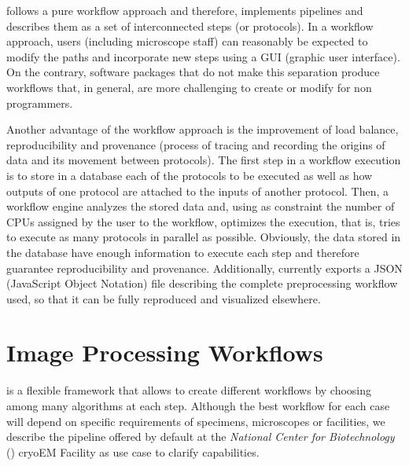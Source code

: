 \scipion follows a pure workflow approach and therefore, implements pipelines and describes them as a set of interconnected steps (or protocols). In a workflow approach, users (including microscope staff) can reasonably be expected to modify the paths and incorporate new steps using a GUI (graphic user interface). On the contrary, software packages that do not make this separation produce workflows that, in general, are more challenging to create or modify for non programmers. 

Another advantage of the workflow approach 
is the improvement of load balance, reproducibility and  provenance (process of tracing and recording the origins of data and its movement between protocols). The first step in a \scipion workflow execution
is to store in a database each of the protocols to be executed as well as how 
outputs of one protocol are attached to the inputs of another protocol. Then, a workflow engine analyzes the stored data and, using as constraint the number of CPUs assigned by the user to the workflow, optimizes the execution, that is, tries to execute as many protocols in parallel as possible. Obviously, the data stored in the database  have enough information to execute each step and therefore guarantee reproducibility and provenance. Additionally, \scipion currently exports a JSON (JavaScript Object Notation) file describing the complete preprocessing workflow used, so that it can be fully reproduced and visualized elsewhere.



\section{Image Processing Workflows}

\scipion is a flexible framework that allows to create different workflows by choosing among many algorithms at each step. Although the best workflow for each case will depend on specific requirements of specimens, microscopes or facilities, we  describe the pipeline offered by default at the \emph{National Center for Biotechnology} (\cnb) cryoEM Facility as use case to clarify \scipion capabilities.

